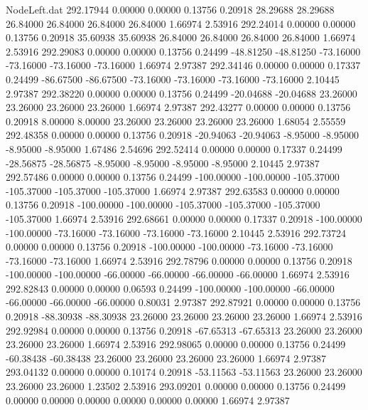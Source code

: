 \begin{filecontents}{NodeLeft.dat}
 292.17944    0.00000    0.00000     0.13756    0.20918   28.29688   28.29688   26.84000   26.84000   26.84000   26.84000    1.66974    2.53916
 292.24014    0.00000    0.00000     0.13756    0.20918   35.60938   35.60938   26.84000   26.84000   26.84000   26.84000    1.66974    2.53916
 292.29083    0.00000    0.00000     0.13756    0.24499  -48.81250  -48.81250  -73.16000  -73.16000  -73.16000  -73.16000    1.66974    2.97387
 292.34146    0.00000    0.00000     0.17337    0.24499  -86.67500  -86.67500  -73.16000  -73.16000  -73.16000  -73.16000    2.10445    2.97387
 292.38220    0.00000    0.00000     0.13756    0.24499  -20.04688  -20.04688   23.26000   23.26000   23.26000   23.26000    1.66974    2.97387
 292.43277    0.00000    0.00000     0.13756    0.20918    8.00000    8.00000   23.26000   23.26000   23.26000   23.26000    1.68054    2.55559
 292.48358    0.00000    0.00000     0.13756    0.20918  -20.94063  -20.94063   -8.95000   -8.95000   -8.95000   -8.95000    1.67486    2.54696
 292.52414    0.00000    0.00000     0.17337    0.24499  -28.56875  -28.56875   -8.95000   -8.95000   -8.95000   -8.95000    2.10445    2.97387
 292.57486    0.00000    0.00000     0.13756    0.24499 -100.00000 -100.00000 -105.37000 -105.37000 -105.37000 -105.37000    1.66974    2.97387
 292.63583    0.00000    0.00000     0.13756    0.20918 -100.00000 -100.00000 -105.37000 -105.37000 -105.37000 -105.37000    1.66974    2.53916
 292.68661    0.00000    0.00000     0.17337    0.20918 -100.00000 -100.00000  -73.16000  -73.16000  -73.16000  -73.16000    2.10445    2.53916
 292.73724    0.00000    0.00000     0.13756    0.20918 -100.00000 -100.00000  -73.16000  -73.16000  -73.16000  -73.16000    1.66974    2.53916
 292.78796    0.00000    0.00000     0.13756    0.20918 -100.00000 -100.00000  -66.00000  -66.00000  -66.00000  -66.00000    1.66974    2.53916
 292.82843    0.00000    0.00000     0.06593    0.24499 -100.00000 -100.00000  -66.00000  -66.00000  -66.00000  -66.00000    0.80031    2.97387
 292.87921    0.00000    0.00000     0.13756    0.20918  -88.30938  -88.30938   23.26000   23.26000   23.26000   23.26000    1.66974    2.53916
 292.92984    0.00000    0.00000     0.13756    0.20918  -67.65313  -67.65313   23.26000   23.26000   23.26000   23.26000    1.66974    2.53916
 292.98065    0.00000    0.00000     0.13756    0.24499  -60.38438  -60.38438   23.26000   23.26000   23.26000   23.26000    1.66974    2.97387
 293.04132    0.00000    0.00000     0.10174    0.20918  -53.11563  -53.11563   23.26000   23.26000   23.26000   23.26000    1.23502    2.53916
 293.09201    0.00000    0.00000     0.13756    0.24499    0.00000    0.00000    0.00000    0.00000    0.00000    0.00000    1.66974    2.97387

\end{filecontents}
